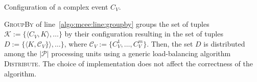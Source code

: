 \begin{algorithm}[H]
  \DontPrintSemicolon
  \SetAlgoNoEnd %
  \SetAlgoNoLine %
  \LinesNumbered
\caption{Configuration of a complex event $C_{V}$.}
\label{algo:configurations}
\end{algorithm}


\textsc{GroupBy} of line~\ref{algo:mcee:line:groupby} groups the set of tuples $\mathcal{K} := \{\langle C_{V}, K \rangle, \ldots\}$ by their configuration resulting in the set of tuples $D := \{\langle K, \mathcal{C}_{V}\} \rangle, \ldots \}$, where $\mathcal{C}_{V} := \{C^{1}_{V}, \ldots, C^{m}_{V}\}$. Then, the set $D$ is distributed among the $|\mathcal{P}|$ processing units using a generic load-balancing algorithm \textsc{Distribute}. The choice of implementation does not affect the correctness of the algorithm.

